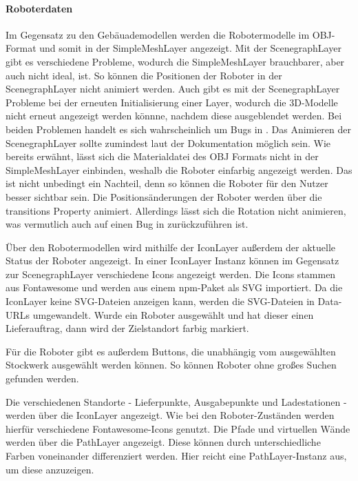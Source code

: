 \paragraph{Roboterdaten}
Im Gegensatz zu den Gebäuademodellen werden die Robotermodelle im \ac{OBJ}-Format und somit in der SimpleMeshLayer angezeigt. Mit der ScenegraphLayer gibt es verschiedene Probleme, wodurch die SimpleMeshLayer brauchbarer, aber auch nicht ideal, ist. So können die Positionen der Roboter in der ScenegraphLayer nicht animiert werden. Auch gibt es mit der ScenegraphLayer Probleme bei der erneuten Initialisierung einer Layer, wodurch die 3D-Modelle nicht erneut angezeigt werden könnne, nachdem diese ausgeblendet werden. Bei beiden Problemen handelt es sich wahrscheinlich um Bugs in \deckgl{}. Das Animieren der ScenegraphLayer sollte zumindest laut der Dokumentation möglich sein. 
Wie bereits erwähnt, lässt sich die Materialdatei des \ac{OBJ} Formats nicht in der SimpleMeshLayer einbinden, weshalb die Roboter einfarbig angezeigt werden. Das ist nicht unbedingt ein Nachteil, denn so können die Roboter für den Nutzer besser sichtbar sein. Die Positionsänderungen der Roboter werden über die transitions Property animiert. Allerdings lässt sich die Rotation nicht animieren, was vermutlich auch auf einen Bug in \deckgl{} zurückzuführen ist.

Über den Robotermodellen wird mithilfe der IconLayer außerdem der aktuelle Status der Roboter angezeigt. In einer IconLayer Instanz können im Gegensatz zur ScenegraphLayer verschiedene Icons angezeigt werden. 
Die Icons stammen aus Fontawesome und werden aus einem \ac{npm}-Paket als \ac{SVG} importiert. Da die IconLayer keine \ac{SVG}-Dateien anzeigen kann, werden die SVG-Dateien in Data-URLs umgewandelt.
Wurde ein Roboter ausgewählt und hat dieser einen Lieferauftrag, dann wird der Zielstandort farbig markiert.

Für die Roboter gibt es außerdem Buttons, die unabhängig vom ausgewählten Stockwerk ausgewählt werden können. So können Roboter ohne großes Suchen gefunden werden.

Die verschiedenen Standorte - Lieferpunkte, Ausgabepunkte und Ladestationen - werden über die IconLayer angezeigt. Wie bei den Roboter-Zuständen werden hierfür verschiedene Fontawesome-Icons genutzt. Die Pfade und virtuellen Wände werden über die PathLayer angezeigt. Diese können durch unterschiedliche Farben voneinander differenziert werden. 
Hier reicht eine PathLayer-Instanz aus, um diese anzuzeigen.


